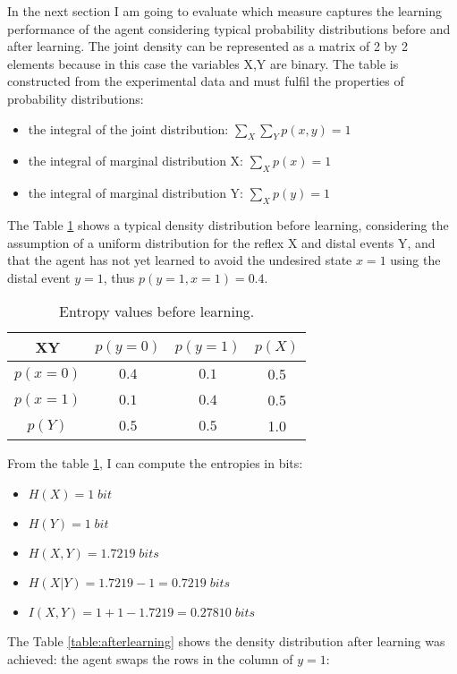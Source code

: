 In the next section I am going to evaluate which measure captures the learning performance of 
the agent considering typical probability distributions before and after learning.
The joint density can be represented as a matrix of 2 by 2 elements because in this case the 
variables X,Y are binary.
The table is constructed from the experimental data and must fulfil the properties
of probability distributions:
\begin{itemize}
 \item the integral of the joint distribution: $\sum_X \sum_Y p(x,y)=1$
 \item the integral of marginal distribution X: $\sum_X p(x)=1$
 \item the integral of marginal distribution Y: $\sum_X p(y)=1$
\end{itemize}
The Table \ref{table:beforelearning} shows a typical density distribution before learning,
considering the assumption of a uniform distribution for the reflex X and distal events Y,
and that the agent has not yet learned to avoid the undesired state $x=1$ using the
distal event $y=1$, thus $p(y=1,x=1)=0.4$. \\

\begin{table}[htbp]
\caption{
Entropy values before learning. \label{table:beforelearning}}
\begin{center}
\begin{tabular}{@{}c|ccc@{}}
\hline
  XY	   & $p(y=0)$ & $p(y=1)$ & $p(X)$\\
\hline
  $p(x=0)$ & $0.4$   & $0.1$   & 0.5\\
  $p(x=1)$ & $0.1$   & $0.4$   & 0.5\\
\hline
  $p(Y)$   & $0.5$   & $0.5$    & 1.0\\
\hline
\end{tabular}
\end{center}
\end{table}

From the table \ref{table:beforelearning}, I can compute the entropies in bits:
\begin{itemize}
 \item $H(X)=1 \; bit$
 \item $H(Y)=1 \; bit$
 \item $H(X,Y)=1.7219 \; bits$
 \item $H(X|Y)=1.7219-1=0.7219 \; bits$
 \item $I(X,Y)=1+1-1.7219=0.27810 \; bits$
\end{itemize}
The Table \ref{table:afterlearning} shows the density distribution after
learning was achieved: the agent swaps the rows in the column of $y=1$:

